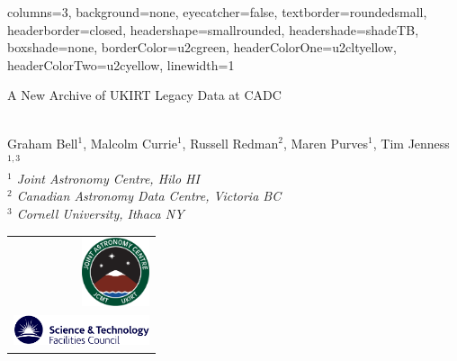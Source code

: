 \documentclass[a0paper,portrait]{baposter}
\begin{document}
\begin{poster}{
    columns=3,
    background=none,
    eyecatcher=false,
    textborder=roundedsmall,
    headerborder=closed,
    headershape=smallrounded,
    headershade=shadeTB,
    boxshade=none,
    borderColor=u2cgreen,
    headerColorOne=u2cltyellow,
    headerColorTwo=u2cyellow,
    linewidth=1
}{

}{\raggedright \smaller
A New Archive of UKIRT Legacy Data at CADC
}{
\vspace{0.1cm} \\
Graham Bell$^1$, Malcolm Currie$^1$, Russell Redman$^2$, Maren Purves$^1$, Tim Jenness$^{1,3}$
\vspace{0.1cm} \\
\smaller[2]
\textsl{$^1$ Joint Astronomy Centre, Hilo HI} \\
\textsl{$^2$ Canadian Astronomy Data Centre, Victoria BC} \\
\textsl{$^3$ Cornell University, Ithaca NY}
}{
\begin{tabular}{r}
\includegraphics[width=2cm]{jaclogo} \\
\includegraphics[width=4cm]{stfclogo}
\end{tabular}
}

\end{poster}
\end{document}
